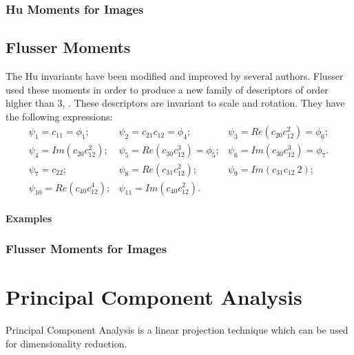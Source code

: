 \subsubsection{Hu Moments for Images}

%


\subsection{Flusser Moments}
\label{sec:FlusserMoments}
The Hu invariants have been modified and
improved by several authors. Flusser used these moments in order to
produce a new family of descriptors of order higher than 3,
\cite{flusserinv}. These descriptors are invariant to scale and
rotation. They have the following expressions:
\begin {equation}
\begin{array}{ccc}
\psi_1  = c_{11} = \phi_1; &  \psi_2  = c_{21}c_{12} = \phi_4; & \psi_3  = Re(c_{20}c_{12}^2) = \phi_6;\\
\psi_4  = Im(c_{20}c_{12}^2); & \psi_5  = Re(c_{30}c_{12}^3) = \phi_5;
& \psi_6  = Im(c_{30}c_{12}^3) = \phi_7.\\
\psi_7  = c_{22}; & \psi_8  = Re(c_{31}c_{12}^2); & \psi_9  = Im(c_{31}c_{12}~2);\\
\psi_{10} = Re(c_{40}c_{12}^4); & \psi_{11} = Im(c_{40}c_{12}^2). &\\

\end{array}
\end {equation}

\textbf{Examples}
\subsubsection{Flusser Moments for Images}

%

\section{Principal Component Analysis}
Principal Component Analysis is a linear projection technique which
can be used for dimensionality reduction.


